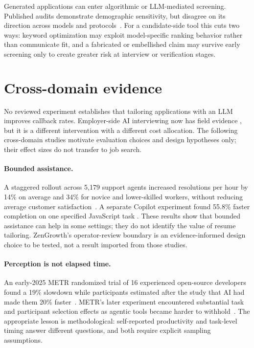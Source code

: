 \documentclass[11pt]{article}
\begin{document}
Generated applications can enter algorithmic or LLM-mediated screening.
Published audits demonstrate demographic sensitivity, but disagree on its
direction across models and protocols~\citep{wilson2024resume,
armstrong2024silicon,gao2026hire}. For a candidate-side tool this cuts two
ways: keyword optimization may exploit model-specific ranking behavior rather
than communicate fit, and a fabricated or embellished claim may survive early
screening only to create greater risk at interview or verification stages.

\section{Cross-domain evidence}
\label{sec:crossdomain}

No reviewed experiment establishes that tailoring applications with an LLM
improves callback rates. Employer-side AI interviewing now has field evidence
\citep{aka2026bettertogether}, but it is a different intervention with a
different cost allocation. The following cross-domain studies motivate
evaluation choices and design hypotheses only; their effect sizes do not
transfer to job search.

\paragraph{Bounded assistance.} A staggered rollout across 5{,}179 support
agents increased resolutions per hour by 14\% on average and 34\% for novice
and lower-skilled workers, without reducing average customer
satisfaction~\citep{brynjolfsson2023generative}. A separate Copilot experiment
found 55.8\% faster completion on one specified JavaScript task
\citep{peng2023copilot}. These results show that bounded assistance can help in
some settings; they do not identify the value of resume tailoring. ZenGrowth's
operator-review boundary is an evidence-informed design choice to be tested,
not a result imported from those studies.

\paragraph{Perception is not elapsed time.} An early-2025 METR randomized
trial of 16 experienced open-source developers found a 19\% slowdown while
participants estimated after the study that AI had made them 20\%
faster~\citep{becker2025metr}. METR's later experiment encountered substantial
task and participant selection effects as agentic tools became harder to
withhold~\citep{metr2026update}. The appropriate lesson is methodological:
self-reported productivity and task-level timing answer different questions,
and both require explicit sampling assumptions.
\end{document}
